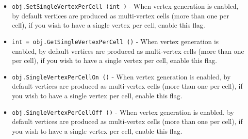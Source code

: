 \begin{itemize}
\item  \verb|obj.SetSingleVertexPerCell (int )| -  When vertex generation is enabled, by default vertices are produced
 as multi-vertex cells (more than one per cell), if you wish to have a single
 vertex per cell, enable this flag.

\item  \verb|int = obj.GetSingleVertexPerCell ()| -  When vertex generation is enabled, by default vertices are produced
 as multi-vertex cells (more than one per cell), if you wish to have a single
 vertex per cell, enable this flag.

\item  \verb|obj.SingleVertexPerCellOn ()| -  When vertex generation is enabled, by default vertices are produced
 as multi-vertex cells (more than one per cell), if you wish to have a single
 vertex per cell, enable this flag.

\item  \verb|obj.SingleVertexPerCellOff ()| -  When vertex generation is enabled, by default vertices are produced
 as multi-vertex cells (more than one per cell), if you wish to have a single
 vertex per cell, enable this flag.

\end{itemize}
